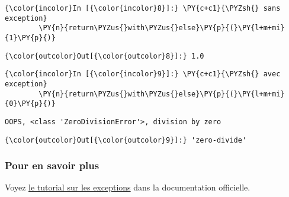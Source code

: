     \begin{Verbatim}[commandchars=\\\{\}]
{\color{incolor}In [{\color{incolor}8}]:} \PY{c+c1}{\PYZsh{} sans exception}
        \PY{n}{return\PYZus{}with\PYZus{}else}\PY{p}{(}\PY{l+m+mi}{1}\PY{p}{)}
\end{Verbatim}


\begin{Verbatim}[commandchars=\\\{\}]
{\color{outcolor}Out[{\color{outcolor}8}]:} 1.0
\end{Verbatim}
            
    \begin{Verbatim}[commandchars=\\\{\}]
{\color{incolor}In [{\color{incolor}9}]:} \PY{c+c1}{\PYZsh{} avec exception}
        \PY{n}{return\PYZus{}with\PYZus{}else}\PY{p}{(}\PY{l+m+mi}{0}\PY{p}{)}
\end{Verbatim}


    \begin{Verbatim}[commandchars=\\\{\}]
OOPS, <class 'ZeroDivisionError'>, division by zero

    \end{Verbatim}

\begin{Verbatim}[commandchars=\\\{\}]
{\color{outcolor}Out[{\color{outcolor}9}]:} 'zero-divide'
\end{Verbatim}
            
    \hypertarget{pour-en-savoir-plus}{%
\subsubsection{Pour en savoir plus}\label{pour-en-savoir-plus}}

    Voyez
\href{https://docs.python.org/3/tutorial/errors.html\#handling-exceptions}{le
tutorial sur les exceptions} dans la documentation officielle.


    
    
    
